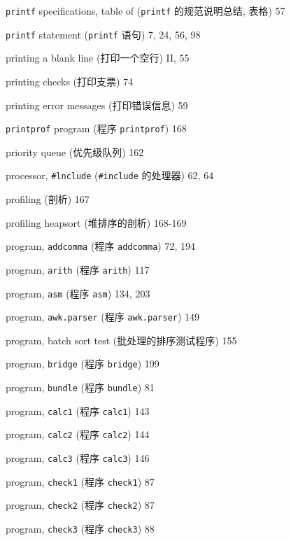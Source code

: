 \begin{multicols}{3}
\hangindent=3pc  \verb'printf' specifications, table of
(\verb'printf' 的规范说明总结, 表格) 57


\hangindent=3pc  \verb'printf' statement (\verb'printf' 语句)
7, 24, 56, 98

\hangindent=3pc  printing a blank line (打印一个空行) II, 55

\hangindent=3pc  printing checks (打印支票) 74

\hangindent=3pc  printing error messages (打印错误信息) 59

\hangindent=3pc  \verb'printprof' program (程序
\verb'printprof') 168

\hangindent=3pc  priority queue (优先级队列) 162

\hangindent=3pc  processor, \verb'#lnclude' (\verb'#include'
的处理器) 62, 64

\hangindent=3pc  profiling (剖析) 167

\hangindent=3pc  profiling heapsort (堆排序的剖析) 168-169

\hangindent=3pc  program, \verb'addcomma' (程序 \verb'addcomma')
72, 194

\hangindent=3pc  program, \verb'arith' (程序 \verb'arith') 117

\hangindent=3pc  program, \verb'asm' (程序 \verb'asm') 134, 203

\hangindent=3pc  program, \verb'awk.parser' 
(程序 \verb'awk.parser') 149

\hangindent=3pc  program, batch sort test
(批处理的排序测试程序) 155

\hangindent=3pc  program, \verb'bridge' (程序 \verb'bridge') 199

\hangindent=3pc  program, \verb'bundle'  (程序 \verb'bundle') 81

\hangindent=3pc  program, \verb'calc1' (程序 \verb'calc1') 143

\hangindent=3pc  program, \verb'calc2' (程序 \verb'calc2') 144

\hangindent=3pc  program, \verb'calc3' (程序 \verb'calc3') 146

\hangindent=3pc  program, \verb'check1' (程序 \verb'check1') 87

\hangindent=3pc  program, \verb'check2' (程序 \verb'check2') 87

\hangindent=3pc  program, \verb'check3' (程序 \verb'check3') 88


\end{multicols}
